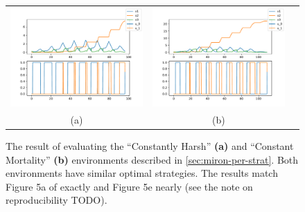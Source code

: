 \documentclass{article}
\begin{document}
\begin{figure}
  \centering
  \begin{tabular}{ccc}
    \includegraphics[width=3in]{imgs/MironchenkoFigure5a.pdf} &
    \includegraphics[width=3in]{imgs/MironchenkoFigure5e.pdf} \\
    (a) & (b)
  \end{tabular}
  \caption{The result of evaluating the ``Constantly Harsh'' \textbf{(a)} and ``Constant Mortality'' \textbf{(b)} environments described in \autoref{sec:miron-per-strat}. Both environments have similar optimal strategies. The results match Figure 5a of \citep{mironchenko_optimal_2014} exactly and Figure 5e nearly (see the note on reproducibility TODO).\label{fig:mironchenko-fig5ae}}
\end{figure}
\end{document}
